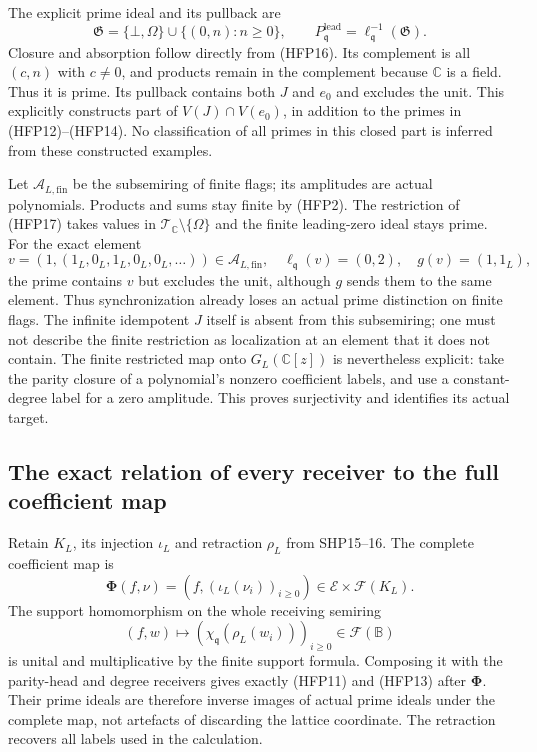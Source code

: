 The explicit prime ideal and its pullback are
\begin{equation}\tag{HFP18}
 \mathfrak G=\{\bot,\Omega\}\cup\{(0,n):n\ge0\},
 \qquad P^{\mathrm{lead}}_{\mathfrak q}
                   =\ell_{\mathfrak q}^{-1}(\mathfrak G).
\end{equation}
Closure and absorption follow directly from (HFP16).
Its complement is all $(c,n)$ with $c\ne0$, and products
remain in the complement because $\mathbb C$ is a field.
Thus it is prime. Its pullback contains both $J$ and $e_0$
and excludes the unit. This explicitly constructs part of
$V(J)\cap V(e_0)$, in addition to the primes in (HFP12)--(HFP14).
No classification of all primes in this closed part is
inferred from these constructed examples.

Let $\mathcal A_{L,\mathrm{fin}}$ be the subsemiring of finite
flags; its amplitudes are actual polynomials. Products and
sums stay finite by (HFP2). The restriction of (HFP17) takes
values in $\mathscr T_{\mathbb C}\setminus\{\Omega\}$ and
the finite leading-zero ideal stays prime. For the exact
element
\begin{equation}\tag{HFP19}
 v=(1,(1_L,0_L,1_L,0_L,0_L,\ldots))
       \in\mathcal A_{L,\mathrm{fin}},
 \quad \ell_{\mathfrak q}(v)=(0,2),\quad g(v)=(1,1_L),
\end{equation}
the prime contains $v$ but excludes the unit, although $g$
sends them to the same element. Thus synchronization already
loses an actual prime distinction on finite flags. The
infinite idempotent $J$ itself is absent from this subsemiring;
one must not describe the finite restriction as localization
at an element that it does not contain. The finite restricted
map onto $G_L(\mathbb C[z])$ is nevertheless explicit: take
the parity closure of a polynomial's nonzero coefficient
labels, and use a constant-degree label for a zero amplitude.
This proves surjectivity and identifies its actual target.

\subsection{The exact relation of every receiver to the full coefficient map}

Retain $K_L$, its injection $\iota_L$ and retraction $\rho_L$
from SHP15--16. The complete coefficient map is
\begin{equation}\tag{HFP20}
 \boldsymbol\Phi(f,\nu)=(f,(\iota_L(\nu_i))_{i\ge0})
                 \in\mathcal E\times\mathcal F(K_L).
\end{equation}
The support homomorphism on the whole receiving semiring
\begin{equation}\tag{HFP21}
 (f,w)\longmapsto
           (\chi_{\mathfrak q}(\rho_L(w_i)))_{i\ge0}
                       \in\mathcal F(\mathbb B)
\end{equation}
is unital and multiplicative by the finite support formula.
Composing it with the parity-head and degree receivers gives
exactly (HFP11) and (HFP13) after $\boldsymbol\Phi$.
Their prime ideals are therefore inverse images of actual
prime ideals under the complete map, not artefacts of
discarding the lattice coordinate. The retraction recovers
all labels used in the calculation.

